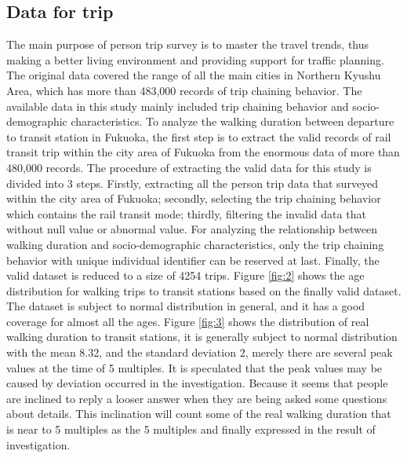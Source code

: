 \documentclass[Journal,letterpaper]{ascelike-new}
\begin{document}
\subsection{Data for trip}
The main purpose of person trip survey is to master the travel trends, thus making a better living environment and providing support for traffic planning. The original data covered the range of all the main cities in Northern Kyushu Area, which has more than 483,000 records of trip chaining behavior. The available data in this study mainly included trip chaining behavior and socio-demographic characteristics.
%
To analyze the walking duration between departure to transit station in Fukuoka, the first step is to extract the valid records of rail transit trip within the city area of Fukuoka from the enormous data of more than 480,000 records. The procedure of extracting the valid data for this study is divided into 3 steps. Firstly, extracting all the person trip data that surveyed within the city area of Fukuoka; secondly, selecting the trip chaining behavior which contains the rail transit mode; thirdly, filtering the invalid data that without null value or abnormal value. For analyzing the relationship between walking duration and socio-demographic characteristics, only the trip chaining behavior with unique individual identifier can be reserved at last. Finally, the valid dataset is reduced to a size of 4254 trips.
%
Figure \ref{fig:2} shows the age distribution for walking trips to transit stations based on the finally valid dataset. The dataset is subject to normal distribution in general, and it has a good coverage for almost all the ages. Figure \ref{fig:3} shows the distribution of real walking duration to transit stations, it is generally subject to normal distribution with the mean 8.32, and the standard deviation 2, merely there are several peak values at the time of 5 multiples. It is speculated that the peak values may be caused by deviation occurred in the investigation. Because it seems that people are inclined to reply a looser answer when they are being asked some questions about details. This inclination will count some of the real walking duration that is near to 5 multiples as the 5 multiples and finally expressed in the result of investigation.
%
\end{document}
